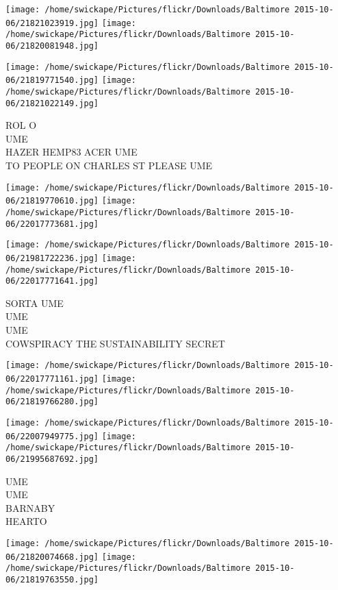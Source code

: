 \documentclass[10pt,letterpaper]{article}
\begin{document}
\texttt{[image: /home/swickape/Pictures/flickr/Downloads/Baltimore 2015-10-06/21821023919.jpg]}
\texttt{[image: /home/swickape/Pictures/flickr/Downloads/Baltimore 2015-10-06/21820081948.jpg]}

\texttt{[image: /home/swickape/Pictures/flickr/Downloads/Baltimore 2015-10-06/21819771540.jpg]}
\texttt{[image: /home/swickape/Pictures/flickr/Downloads/Baltimore 2015-10-06/21821022149.jpg]}

ROL O\\
UME\\
HAZER HEMP83 ACER UME\\
TO PEOPLE ON CHARLES ST PLEASE UME\\
\pagebreak

\texttt{[image: /home/swickape/Pictures/flickr/Downloads/Baltimore 2015-10-06/21819770610.jpg]}
\texttt{[image: /home/swickape/Pictures/flickr/Downloads/Baltimore 2015-10-06/22017773681.jpg]}

\texttt{[image: /home/swickape/Pictures/flickr/Downloads/Baltimore 2015-10-06/21981722236.jpg]}
\texttt{[image: /home/swickape/Pictures/flickr/Downloads/Baltimore 2015-10-06/22017771641.jpg]}

SORTA UME\\
UME\\
UME\\
COWSPIRACY THE SUSTAINABILITY SECRET\\
\pagebreak

\texttt{[image: /home/swickape/Pictures/flickr/Downloads/Baltimore 2015-10-06/22017771161.jpg]}
\texttt{[image: /home/swickape/Pictures/flickr/Downloads/Baltimore 2015-10-06/21819766280.jpg]}

\texttt{[image: /home/swickape/Pictures/flickr/Downloads/Baltimore 2015-10-06/22007949775.jpg]}
\texttt{[image: /home/swickape/Pictures/flickr/Downloads/Baltimore 2015-10-06/21995687692.jpg]}

UME\\
UME\\
BARNABY\\
HEARTO\\
\pagebreak

\texttt{[image: /home/swickape/Pictures/flickr/Downloads/Baltimore 2015-10-06/21820074668.jpg]}
\texttt{[image: /home/swickape/Pictures/flickr/Downloads/Baltimore 2015-10-06/21819763550.jpg]}
\end{document}
